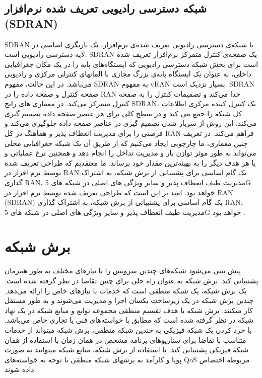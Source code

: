 \subsection{شبکه دسترسی رادیویی تعریف شده نرم‌افزار (SDRAN)}
SDRAN 
یا شبکه‌ی دسترسی رادیویی تعریف‌ شده‌ی نرم‌افزار، یک بازنگری اساسی در لایه دسترسی رادیویی است.
SDRAN
یک صفحه‌ی کنترل متمرکز نرم‌افزار تعریف شده است برای بخش شبکه دسترسی رادیویی که ایستگاه‌های پایه را در یک مکان جغرافیایی داخلی، به عنوان یک ایستگاه پایه‌ی بزرگ مجازی با المانهای کنترلی مرکزی و رادیویی می‌باشد.
در این حالت، مفهوم SDRAN به مفهوم vRAN بسیار نزدیک است.
SDRAN
 صفحه کنترل و صفحه داده را در
 RAN 
 جدا می‌کند و تصمیمات کنترل را به صفحه کنترل متمرکز می‌کند. در معماری های رایج SDRAN، یک کنترل کننده مرکزی اطلاعات کل شبکه را جمع می کند و در سطح کلی برای هر عنصر صفحه داده تصمیم گیری می‌کند. این روش از سربار شدن تصمیم گیری در عناصر صفحه داده جلوگیری می‌کند و فرصتی را برای مدیریت انعطاف پذیر و هماهنگ در کل RAN فراهم می‌کند.
در تعریف چنین معماری، ما چارچوبی ایجاد می‌کنیم که از طریق آن یک شبکه جغرافیایی محلی می‌تواند به طور موثر توازن بار و مدیریت تداخل را انجام دهد و همچنین نرخ عملیاتی و یا هر هدف دیگر را به بهینه‌ترین مقدار خود برساند.
ما معتقدیم که طراحی تعریف شده توسط نرم افزار در RAN یک گام اساسی برای پشتیبانی از برش شبکه، به اشتراک گذاری RAN، مدیریت طیف انعطاف پذیر و سایر ویژگی های اصلی در شبکه های 5G خواهد بود.
امید بر این است که طراحی تعریف شده توسط نرم افزار در RAN 
(SDRAN) 
یک گام اساسی برای پشتیبانی از برش شبکه، به اشتراک گذاری RAN، مدیریت طیف انعطاف پذیر و سایر ویژگی های اصلی در شبکه های 5G خواهد بود
\cite{gudipati2013softran,yu2017hsdran}. 

 \section{برش شبکه}
 پیش بینی می‌شود شبکه‌‌های  چندین سرویس را با نیازهای مختلف به طور همزمان پشتیبانی کند.
 برش شبکه
به عنوان راه حلی برای چنین تقاضا در نظر گرفته شده است.
یک برش شبکه، یک شبکه منطقی  است که خدمات  با نیازهای خاص را ارائه می‌دهد.
 چندین برش شبکه
در یک زیرساخت یکسان
  اجرا و مدیریت می‌شوند و
به طور مستقل کار میکنند.
برش شبکه
 با هدف تقسیم منطقی مجموعه توابع و منابع شبکه در یک نهاد شبکه در نظر گرفته شده است که مطابق با خواسته‌‌های فنی یا تجاری خاص می‌باشد.
 با خرد کردن یک شبکه فیزیکی به چندین شبکه منطقی، برش شبکه میتواند از خدمات متناسب با تقاضا برای سناریوهای برنامه مشخص در همان زمان با استفاده از همان شبکه فیزیکی پشتیبانی کند.
با استفاده از برش شبکه، منابع شبکه میتوانند به صورت پویا و کارآمد به برشهای شبکه منطقی با توجه به خواسته‌‌های QoS مربوطه اختصاص داده شوند\cite{NS1}. 

